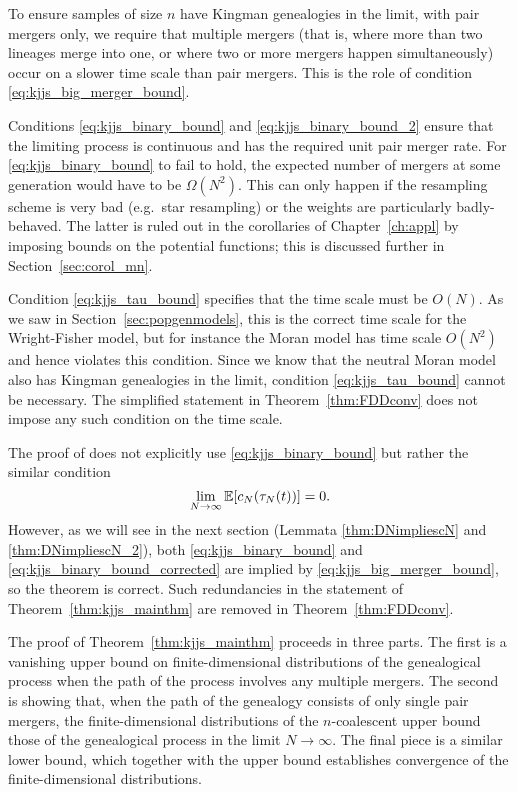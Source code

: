 To ensure samples of size $n$ have Kingman genealogies in the limit, with pair mergers only, we require that multiple mergers (that is, where more than two lineages merge into one, or where two or more mergers happen simultaneously) occur on a slower time scale than pair mergers. 
This is the role of condition \eqref{eq:kjjs_big_merger_bound}.

Conditions \eqref{eq:kjjs_binary_bound} and \eqref{eq:kjjs_binary_bound_2} ensure that the limiting process is continuous and has the required unit pair merger rate.
For \eqref{eq:kjjs_binary_bound} to fail to hold, the expected number of mergers at some generation would have to be $\Omega(N^2)$. This can only happen if the resampling scheme is very bad (e.g.\ star resampling) or the weights are particularly badly-behaved. The latter is ruled out in the corollaries of Chapter~\ref{ch:appl} by imposing bounds on the potential functions; this is discussed further in Section~\ref{sec:corol_mn}.

Condition \eqref{eq:kjjs_tau_bound} specifies that the time scale must be $O(N)$. As we saw in Section~\ref{sec:popgenmodels}, this is the correct time scale for the Wright-Fisher model, but for instance the Moran model has time scale $O(N^2)$ and hence violates this condition. 
Since we know that the neutral Moran model also has Kingman genealogies in the limit, condition \eqref{eq:kjjs_tau_bound} cannot be necessary. 
The simplified statement in Theorem~\ref{thm:FDDconv} does not impose any such condition on the time scale.

The proof of \textcite{koskela2018} does not explicitly use \eqref{eq:kjjs_binary_bound} but rather the similar condition
\begin{equation}\label{eq:kjjs_binary_bound_corrected}
\lim_{ N \rightarrow \infty } \mathbb{E}[ c_N( \tau_N(t) ) ] = 0 .
\end{equation}
However, as we will see in the next section (Lemmata \ref{thm:DNimpliescN} and \ref{thm:DNimpliescN_2}), both \eqref{eq:kjjs_binary_bound} and \eqref{eq:kjjs_binary_bound_corrected} are implied by \eqref{eq:kjjs_big_merger_bound}, so the theorem is correct. 
Such redundancies in the statement of Theorem~\ref{thm:kjjs_mainthm} are removed in Theorem~\ref{thm:FDDconv}.


The proof of Theorem~\ref{thm:kjjs_mainthm} \parencite[i.e.][Theorem 1]{koskela2018} proceeds in three parts.
The first is a vanishing upper bound on finite-dimensional distributions of the genealogical process when the path of the process involves any multiple mergers.
The second is showing that, when the path of the genealogy consists of only single pair mergers, the finite-dimensional distributions of the $n$-coalescent upper bound those of the genealogical process in the limit $N\to\infty$.
The final piece is a similar lower bound, which together with the upper bound establishes convergence of the finite-dimensional distributions.




